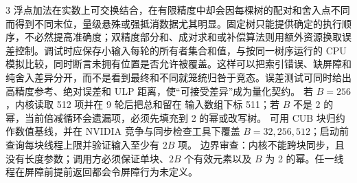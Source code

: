 \begin{solutionexercise}{3}
浮点加法在实数上可交换结合，在有限精度中却会因每棵树的配对和舍入点不同而得到不同末位，量级悬殊或强抵消数据尤其明显。固定树只能提供确定的执行顺序，不必然提高准确度；双精度部分和、成对求和或补偿算法则用额外资源换取误差控制。调试时应保存小输入每轮的所有者集合和值，与按同一树序运行的 CPU 模拟比较，同时断言未拥有位置是否允许被覆盖。这样可以把索引错误、缺屏障和纯舍入差异分开，而不是看到最终和不同就笼统归咎于竞态。误差测试可同时给出高精度参考、绝对误差和 ULP 距离，使“可接受差异”成为量化契约。
\variantheading 若 $B=256$，内核读取 512 项并在 9 轮后把总和留在
输入数组下标 511；若 $B$ 不是 2 的幂，当前倍减循环会遗漏项，必须先填充到 2 的幂或改写树。
\practiceheading 可用 CUB 块归约作数值基线，并在 NVIDIA 竞争与同步检查工具下覆盖
$B=32,256,512$；启动前查询每块线程上限并验证输入至少有
$2B$ 项。
边界审查：内核不能跨块同步，且没有长度参数；调用方必须保证单块、$2B$ 个有效元素以及
$B$ 为 2 的幂。任一线程在屏障前提前返回都会令屏障行为未定义。
\end{solutionexercise}

